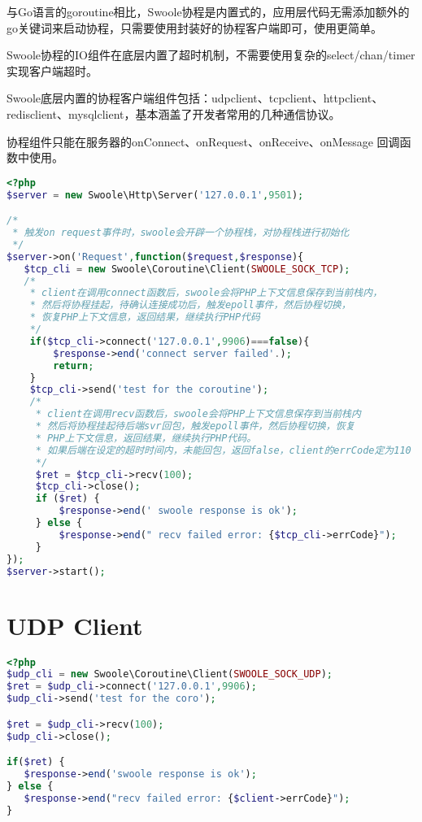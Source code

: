 与Go语言的goroutine相比，Swoole协程是内置式的，应用层代码无需添加额外的go关键词来启动协程，只需要使用封装好的协程客户端即可，使用更简单。



Swoole协程的IO组件在底层内置了超时机制，不需要使用复杂的select/chan/timer实现客户端超时。

Swoole底层内置的协程客户端组件包括：udpclient、tcpclient、httpclient、redisclient、mysqlclient，基本涵盖了开发者常用的几种通信协议。

协程组件只能在服务器的onConnect、onRequest、onReceive、onMessage 回调函数中使用。

\begin{lstlisting}[language=PHP]
<?php
$server = new Swoole\Http\Server('127.0.0.1',9501);

/*
 * 触发on request事件时，swoole会开辟一个协程栈，对协程栈进行初始化
 */
$server->on('Request',function($request,$response){
   $tcp_cli = new Swoole\Coroutine\Client(SWOOLE_SOCK_TCP);
   /*
    * client在调用connect函数后，swoole会将PHP上下文信息保存到当前栈内，
    * 然后将协程挂起，待确认连接成功后，触发epoll事件，然后协程切换，
    * 恢复PHP上下文信息，返回结果，继续执行PHP代码
    */
    if($tcp_cli->connect('127.0.0.1',9906)===false){
        $response->end('connect server failed'.);
        return;
    }
    $tcp_cli->send('test for the coroutine');
    /*
     * client在调用recv函数后，swoole会将PHP上下文信息保存到当前栈内
     * 然后将协程挂起待后端svr回包，触发epoll事件，然后协程切换，恢复
     * PHP上下文信息，返回结果，继续执行PHP代码。
     * 如果后端在设定的超时时间内，未能回包，返回false，client的errCode定为110
     */
     $ret = $tcp_cli->recv(100);
     $tcp_cli->close();
     if ($ret) {
         $response->end(' swoole response is ok');
     } else {
         $response->end(" recv failed error: {$tcp_cli->errCode}");
     }
});
$server->start();
\end{lstlisting}

\section{UDP Client}


\begin{lstlisting}[language=PHP]
<?php
$udp_cli = new Swoole\Coroutine\Client(SWOOLE_SOCK_UDP);
$ret = $udp_cli->connect('127.0.0.1',9906);
$udp_cli->send('test for the coro');

$ret = $udp_cli->recv(100);
$udp_cli->close();

if($ret) {
   $response->end('swoole response is ok');
} else {
   $response->end("recv failed error: {$client->errCode}");
}
\end{lstlisting}

